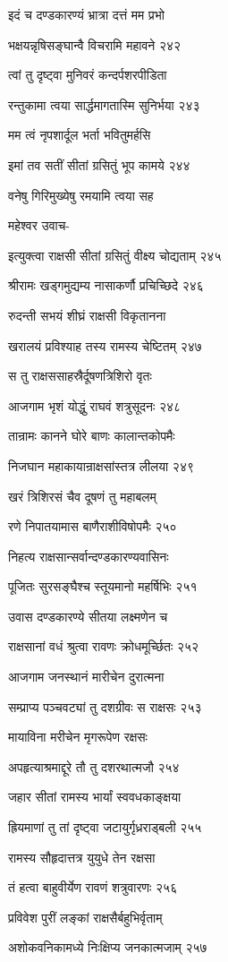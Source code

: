 इदं च दण्डकारण्यं भ्रात्रा दत्तं मम प्रभो

भक्षयन्नृषिसङ्घान्वै विचरामि महावने २४२

त्वां तु दृष्ट्वा मुनिवरं कन्दर्पशरपीडिता

रन्तुकामा त्वया सार्द्धमागतास्मि सुनिर्भया २४३

मम त्वं नृपशार्दूल भर्ता भवितुमर्हसि

इमां तव सतीं सीतां ग्रसितुं भूप कामये २४४

वनेषु गिरिमुख्येषु रमयामि त्वया सह

महेश्वर उवाच-

इत्युक्त्वा राक्षसी सीतां ग्रसितुं वीक्ष्य चोद्यताम् २४५

श्रीरामः खड्गमुद्यम्य नासाकर्णौ प्रचिच्छिदे २४६

रुदन्ती सभयं शीघ्रं राक्षसी विकृतानना

खरालयं प्रविश्याह तस्य रामस्य चेष्टितम् २४७

स तु राक्षससाहस्रैर्दूषणत्रिशिरो वृतः

आजगाम भृशं योद्धुं राघवं शत्रुसूदनः २४८

तान्रामः कानने घोरे बाणः कालान्तकोपमैः

निजघान महाकायान्राक्षसांस्तत्र लीलया २४९

खरं त्रिशिरसं चैव दूषणं तु महाबलम्

रणे निपातयामास बाणैराशीविषोपमैः २५०

निहत्य राक्षसान्सर्वान्दण्डकारण्यवासिनः

पूजितः सुरसङ्घैश्च स्तूयमानो महर्षिभिः २५१

उवास दण्डकारण्ये सीतया लक्ष्मणेन च

राक्षसानां वधं श्रुत्वा रावणः क्रोधमूर्च्छितः २५२

आजगाम जनस्थानं मारीचेन दुरात्मना

सम्प्राप्य पञ्चवट्यां तु दशग्रीवः स राक्षसः २५३

मायाविना मरीचेन मृगरूपेण रक्षसः

अपहृत्याश्रमाद्दूरे तौ तु दशरथात्मजौ २५४

जहार सीतां रामस्य भार्यां स्ववधकाङ्क्षया

ह्रियमाणां तु तां दृष्ट्वा जटायुर्गृध्रराड्बली २५५

रामस्य सौहृदात्तत्र युयुधे तेन रक्षसा

तं हत्वा बाहुवीर्येण रावणं शत्रुवारणः २५६

प्रविवेश पुरीं लङ्कां राक्षसैर्बहुभिर्वृताम्

अशोकवनिकामध्ये निःक्षिप्य जनकात्मजाम् २५७

